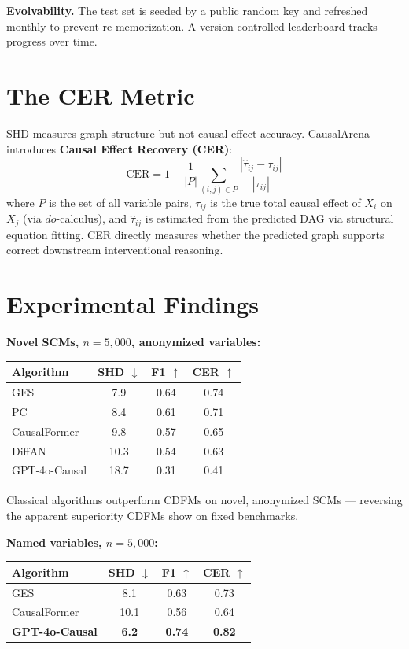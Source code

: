 \documentclass[10pt,twocolumn]{article}
\begin{document}
\textbf{Evolvability.} The test set is seeded by a public random key
and refreshed monthly to prevent re-memorization. A version-controlled
leaderboard tracks progress over time.

\section{The CER Metric}

SHD measures graph structure but not causal effect accuracy. CausalArena
introduces \textbf{Causal Effect Recovery (CER)}:
\[
  \mathrm{CER} = 1 - \frac{1}{|P|} \sum_{(i,j) \in P}
    \frac{|\hat{\tau}_{ij} - \tau_{ij}|}{|\tau_{ij}|}
\]
where $P$ is the set of all variable pairs, $\tau_{ij}$ is the true
total causal effect of $X_i$ on $X_j$ (via $do$-calculus), and
$\hat{\tau}_{ij}$ is estimated from the predicted DAG via structural
equation fitting. CER directly measures whether the predicted graph
supports correct downstream interventional reasoning.

\section{Experimental Findings}

\textbf{Novel SCMs, $n=5{,}000$, anonymized variables:}

\begin{center}
\begin{tabular}{lccc}
\toprule
Algorithm & SHD $\downarrow$ & F1 $\uparrow$ & CER $\uparrow$ \\
\midrule
GES              & 7.9  & 0.64 & 0.74 \\
PC               & 8.4  & 0.61 & 0.71 \\
CausalFormer     & 9.8  & 0.57 & 0.65 \\
DiffAN           & 10.3 & 0.54 & 0.63 \\
GPT-4o-Causal    & 18.7 & 0.31 & 0.41 \\
\bottomrule
\end{tabular}
\end{center}

Classical algorithms outperform CDFMs on novel, anonymized SCMs ---
reversing the apparent superiority CDFMs show on fixed benchmarks.

\textbf{Named variables, $n=5{,}000$:}

\begin{center}
\begin{tabular}{lccc}
\toprule
Algorithm & SHD $\downarrow$ & F1 $\uparrow$ & CER $\uparrow$ \\
\midrule
GES                  & 8.1 & 0.63 & 0.73 \\
CausalFormer         & 10.1 & 0.56 & 0.64 \\
\textbf{GPT-4o-Causal} & \textbf{6.2} & \textbf{0.74} & \textbf{0.82} \\
\bottomrule
\end{tabular}
\end{center}
\end{document}
